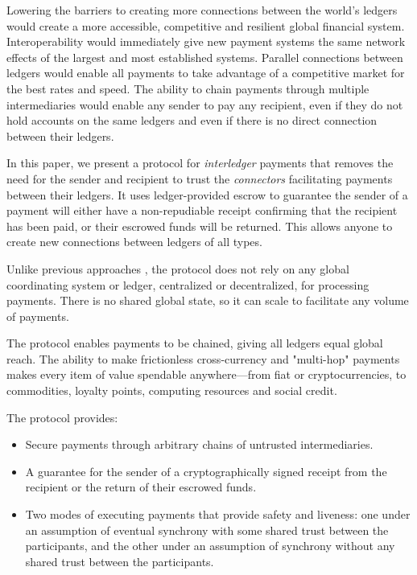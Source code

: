 \documentclass[letterpaper,twocolumn,10pt]{article}
\begin{document}
Lowering the barriers to creating more connections between the world's ledgers would create a more accessible, competitive and resilient global financial system. Interoperability would immediately give new payment systems the same network effects of the largest and most established systems. Parallel connections between ledgers would enable all payments to take advantage of a competitive market for the best rates and speed. The ability to chain payments through multiple intermediaries would enable any sender to pay any recipient, even if they do not hold accounts on the same ledgers and even if there is no direct connection between their ledgers.

In this paper, we present a protocol for \mbox{\textit{interledger}} payments that removes the need for the sender and recipient to trust the \textit{connectors} facilitating payments between their ledgers. It uses ledger-provided escrow to guarantee the sender of a payment will either have a non-repudiable receipt confirming that the recipient has been paid, or their escrowed funds will be returned. This allows anyone to create new connections between ledgers of all types.

Unlike previous approaches \cite{davies1989security} \cite{Bitcoin}\cite{schwartz2014ripple}\cite{wood2014ethereum}\cite{mazieresstellar}\cite{back2014enabling}\cite{poonbitcoin}, the protocol does not rely on any global coordinating system or ledger, centralized or decentralized, for processing payments. There is no shared global state, so it can scale to facilitate any volume of payments.

The protocol enables payments to be chained, giving all ledgers equal global reach. The ability to make frictionless cross-currency and "multi-hop" payments makes every item of value spendable anywhere---from fiat or cryptocurrencies, to commodities, loyalty points, computing resources and social credit.

The protocol provides:
\begin{itemize}
\item Secure payments through arbitrary chains of untrusted intermediaries.
\item A guarantee for the sender of a cryptographically signed receipt from the recipient or the return of their escrowed funds.
\item Two modes of executing payments that provide safety and liveness: one under an assumption of eventual synchrony with some shared trust between the participants, and the other under an assumption of synchrony without any shared trust between the participants.
\end{itemize}
\end{document}
